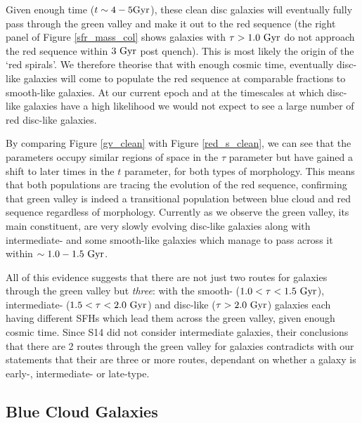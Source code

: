 \documentclass[useAMS,usenatbib]{mn2e}
\begin{document}
Given enough time ($t\sim4-5\rm{Gyr}$), these clean disc galaxies will eventually fully pass through the green valley and make it out to the red sequence (the right panel of Figure \ref{sfr_mass_col} shows galaxies with $\tau > 1.0~\rm{Gyr}$ do not approach the red sequence within $3~\rm{Gyr}$ post quench). This is most likely the origin of the `red spirals'. We therefore theorise that with enough cosmic time, eventually disc-like galaxies will come to populate the red sequence at comparable fractions to smooth-like galaxies. At our current epoch and at the timescales at which disc-like galaxies have a high likelihood we would not expect to see a large number of red disc-like galaxies. 

By comparing Figure \ref{gv_clean} with Figure \ref{red_s_clean}, we can see that the parameters occupy similar regions of space in the $\tau$ parameter but have gained a shift to later times in the $t$ parameter, for both types of morphology. This means that both populations are tracing the evolution of the red sequence, confirming that green valley is indeed a transitional population between blue cloud and red sequence regardless of morphology. Currently as we observe the green valley, its main constituent, are very slowly evolving disc-like galaxies along with intermediate- and some smooth-like galaxies which manage to pass across it within $\sim 1.0-1.5~\rm{Gyr}$.

All of this evidence suggests that there are not just two routes for galaxies through the green valley but \emph{three}: with the smooth- ($1.0 < \tau < 1.5 ~\rm{Gyr}$), intermediate- ($1.5 < \tau < 2.0~\rm{Gyr}$) and disc-like ($\tau > 2.0~\rm{Gyr}$) galaxies each having different SFHs which lead them across the green valley, given enough cosmic time. Since S14 did not consider intermediate galaxies, their conclusions that there are 2 routes through the green valley for galaxies contradicts with our statements that their are three or more routes, dependant on whether a galaxy is early-, intermediate- or late-type. 

\subsection{Blue Cloud Galaxies}\label{bc}
\end{document}
